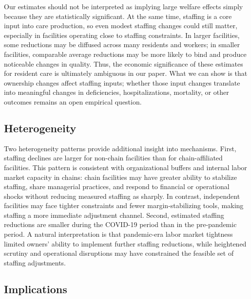 \documentclass[12pt]{article}
\begin{document}
Our estimates should not be interpreted as implying large welfare effects simply because they are statistically significant. At the same time, staffing is a core input into care production, so even modest staffing changes could still matter, especially in facilities operating close to staffing constraints. In larger facilities, some reductions may be diffused across many residents and workers; in smaller facilities, comparable average reductions may be more likely to bind and produce noticeable changes in quality. Thus, the economic significance of these estimates for resident care is ultimately ambiguous in our paper. What we can show is that ownership changes affect staffing inputs; whether those input changes translate into meaningful changes in deficiencies, hospitalizations, mortality, or other outcomes remains an open empirical question.

\subsection{Heterogeneity}

Two heterogeneity patterns provide additional insight into mechanisms. First, staffing declines are larger for non-chain facilities than for chain-affiliated facilities. This pattern is consistent with organizational buffers and internal labor market capacity in chains: chain facilities may have greater ability to stabilize staffing, share managerial practices, and respond to financial or operational shocks without reducing measured staffing as sharply. In contrast, independent facilities may face tighter constraints and fewer margin-stabilizing tools, making staffing a more immediate adjustment channel. Second, estimated staffing reductions are smaller during the COVID-19 period than in the pre-pandemic period. A natural interpretation is that pandemic-era labor market tightness limited owners' ability to implement further staffing reductions, while heightened scrutiny and operational disruptions may have constrained the feasible set of staffing adjustments.

\subsection{Implications}
\end{document}
